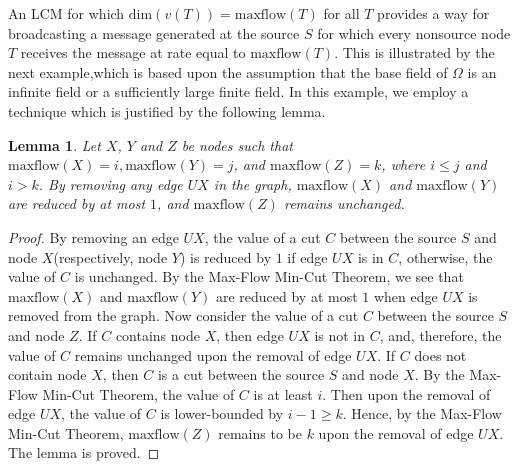 \documentclass[journal]{IEEEtran}
\newtheorem*{proof}{\hskip 2em Proof}
\newtheorem{lemm}[prop]{Lemma}
\begin{document}
\par An LCM for which $\text{dim}(v(T))=\text{maxflow}(T)$ for all $T$ provides a way for broadcasting a message generated at the source $S$ for which every nonsource node $T$ receives the message at rate equal to $\text{maxflow}(T)$. This is illustrated by the next example,which is based upon the assumption that the base field of $\Omega$ is an infinite field or a sufficiently large finite field. In this example, we employ a technique which is justified by the following lemma.
\begin{lemm}
	Let $X$, $Y$ and $Z$ be nodes such that $\text{maxflow}(X)=i,\text{maxflow}(Y)=j$, and $\text{maxflow}(Z)=k$, where $i\leq j$ and $i>k$. By removing any edge $UX$ in the graph, $\text{maxflow}(X)$ and $\text{maxflow}(Y)$ are reduced by at most $1$, and $\text{maxflow}(Z)$ remains unchanged.
\end{lemm}


\begin{proof}
	By removing an edge $UX$, the value of a cut $C$ between the source $S$ and node $X$(respectively, node $Y$) is reduced by $1$ if edge $UX$ is in $C$, otherwise, the value of $C$ is unchanged. By the Max-Flow Min-Cut Theorem, we see that $\text{maxflow}(X)$ and $\text{maxflow}(Y)$ are reduced by at most $1$ when edge $UX$ is removed from the graph. Now consider the value of a cut $C$ between the source $S$ and node $Z$. If $C$ contains node $X$, then edge $UX$ is not in $C$, and, therefore, the value of $C$ remains 	unchanged upon the removal of edge $UX$. If $C$ does not contain node $X$, then $C$ is a cut between the source $S$ and node $X$. By the Max-Flow Min-Cut Theorem, the value of $C$ is at least $i$. Then upon the removal of edge $UX$, the value of $C$ is lower-bounded by $i-1\geq k$. Hence, by the Max-Flow Min-Cut Theorem, $\text{maxflow}(Z)$ remains to be $k$ upon the removal of edge $UX$. The lemma is proved.
\end{proof}
\end{document}

